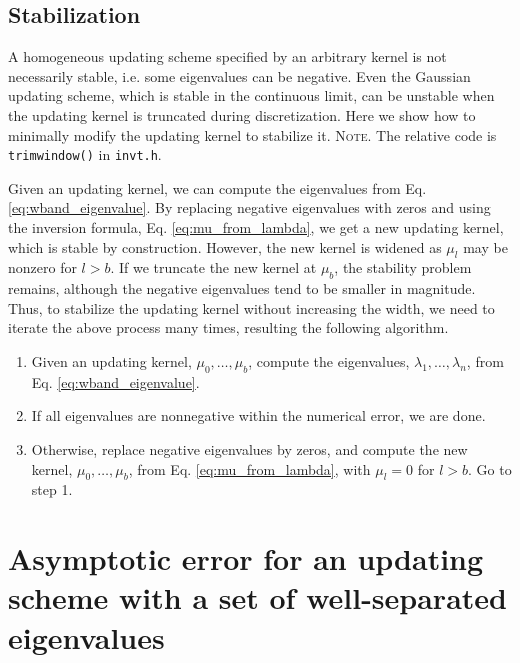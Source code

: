 \documentclass[reprint, superscriptaddress, floatfix]{revtex4-1}
\newcommand{\note}[1]{{\color{DarkGreen}\footnotesize \textsc{Note.} #1}}
\begin{document}
\subsection{\label{sec:stabilize_wband}
Stabilization}



%
A homogeneous updating scheme
specified by an arbitrary kernel
is not necessarily stable,
i.e. some eigenvalues can be negative.
%
%
Even
the Gaussian updating scheme, which is stable in the continuous limit,
can be unstable
when the updating kernel is truncated during discretization.
%
Here we show how to minimally modify
the updating kernel
to stabilize it.
%
\note{The relative code is \texttt{trimwindow()} in \texttt{invt.h}.
}


Given an updating kernel,
we can compute the eigenvalues from
Eq. \eqref{eq:wband_eigenvalue}.
%
By replacing negative eigenvalues with zeros and
using the inversion formula,
Eq. \eqref{eq:mu_from_lambda},
we get a new updating kernel,
which is stable by construction.
%
However, the new kernel is widened
as $\mu_l$ may be nonzero for $l > b$.
%
If we truncate the new kernel at $\mu_b$,
the stability problem remains,
although the negative eigenvalues
tend to be smaller in magnitude.
%
Thus, to stabilize the updating kernel
without increasing the width,
we need to iterate the above process many times,
resulting the following algorithm.


%
\begin{enumerate}
  \item
    Given an updating kernel, $\mu_0, \dots, \mu_b$,
    compute the eigenvalues,
    $\lambda_1, \dots, \lambda_n$,
    from Eq. \eqref{eq:wband_eigenvalue}.
  \item
    If all eigenvalues are nonnegative within the numerical error,
    we are done. %
  \item
    Otherwise, replace negative eigenvalues by zeros,
    and compute the new kernel,
    $\mu_0, \dots, \mu_b$, from
    Eq. \eqref{eq:mu_from_lambda},
    with $\mu_l = 0$ for $l > b$.
    Go to step 1.
\end{enumerate}


\section{\label{sec:upperbound}
Asymptotic error for an updating scheme
with a set of well-separated eigenvalues}
\end{document}
